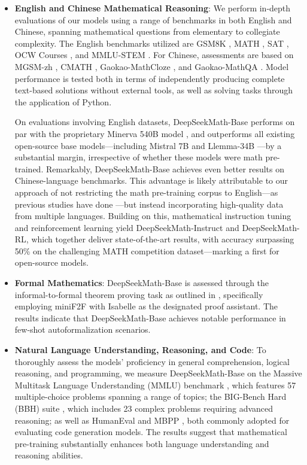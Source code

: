 \begin{itemize}[topsep=0pt]
    \item \textbf{English and Chinese Mathematical Reasoning}: We perform in-depth evaluations of our models using a range of benchmarks in both English and Chinese, spanning mathematical questions from elementary to collegiate complexity. The English benchmarks utilized are GSM8K \citep{gsm8k}, MATH \citep{MATH}, SAT \citep{llemma}, OCW Courses \citep{minerva}, and MMLU-STEM \citep{mmlu}. For Chinese, assessments are based on MGSM-zh \citep{mgsm}, CMATH \citep{wei2023cmath}, Gaokao-MathCloze \citep{agieval}, and Gaokao-MathQA \citep{agieval}. Model performance is tested both in terms of independently producing complete text-based solutions without external tools, as well as solving tasks through the application of Python.

On evaluations involving English datasets, DeepSeekMath-Base performs on par with the proprietary Minerva 540B model \citep{minerva}, and outperforms all existing open-source base models—including Mistral 7B \citep{mistral} and Llemma-34B \citep{llemma}—by a substantial margin, irrespective of whether these models were math pre-trained. Remarkably, DeepSeekMath-Base achieves even better results on Chinese-language benchmarks. This advantage is likely attributable to our approach of not restricting the math pre-training corpus to English—as previous studies have done \citep{minerva,llemma}—but instead incorporating high-quality data from multiple languages. Building on this, mathematical instruction tuning and reinforcement learning yield DeepSeekMath-Instruct and DeepSeekMath-RL, which together deliver state-of-the-art results, with accuracy surpassing 50\% on the challenging MATH competition dataset—marking a first for open-source models.

\item \textbf{Formal Mathematics}: DeepSeekMath-Base is assessed through the informal-to-formal theorem proving task as outlined in \citep{dsp_proof}, specifically employing miniF2F \citep{minif2f} with Isabelle \citep{isabelle} as the designated proof assistant. The results indicate that DeepSeekMath-Base achieves notable performance in few-shot autoformalization scenarios.
\item \textbf{Natural Language Understanding, Reasoning, and Code}: To thoroughly assess the models' proficiency in general comprehension, logical reasoning, and programming, we measure DeepSeekMath-Base on the Massive Multitask Language Understanding (MMLU) benchmark \citep{mmlu}, which features 57 multiple-choice problems spanning a range of topics; the BIG-Bench Hard (BBH) suite \citep{bbh}, which includes 23 complex problems requiring advanced reasoning; as well as HumanEval \citep{codex} and MBPP \citep{mbpp}, both commonly adopted for evaluating code generation models. The results suggest that mathematical pre-training substantially enhances both language understanding and reasoning abilities.


\end{itemize}
